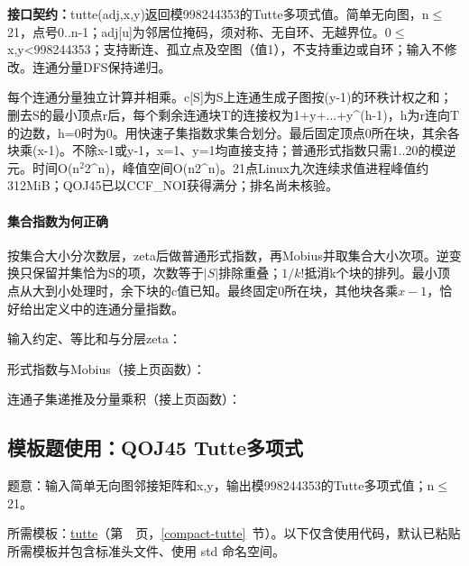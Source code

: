 {\sloppy{}\noindent\textbf{接口契约：}tutte(adj,x,y)返回模998244353的Tutte多项式值。简单无向图，n$\le$21，点号0..n-1；adj[u]为邻居位掩码，须对称、无自环、无越界位。0$\le$x,y<998244353；支持断连、孤立点及空图（值1），不支持重边或自环；输入不修改。连通分量DFS保持递归。

每个连通分量独立计算并相乘。c[S]为S上连通生成子图按(y-1)的环秩计权之和；删去S的最小顶点r后，每个剩余连通块T的连接权为1+y+...+y\textasciicircum{}(h-1)，h为r连向T的边数，h=0时为0。用快速子集指数求集合划分。最后固定顶点0所在块，其余各块乘(x-1)。不除x-1或y-1，x=1、y=1均直接支持；普通形式指数只需1..20的模逆元。时间O(n$^{2}$2\textasciicircum{}n)，峰值空间O(n2\textasciicircum{}n)。21点Linux九次连续求值进程峰值约312MiB；QOJ45已以CCF\_NOI获得满分；排名尚未核验。\par}

\paragraph{集合指数为何正确} 按集合大小分次数层，zeta后做普通形式指数，再Mobius并取集合大小次项。逆变换只保留并集恰为S的项，次数等于$|S|$排除重叠；$1/k!$抵消k个块的排列。最小顶点从大到小处理时，余下块的c值已知。最终固定0所在块，其他块各乘$x-1$，恰好给出定义中的连通分量指数。

\newpage\noindent 输入约定、等比和与分层zeta：



\newpage\noindent 形式指数与Mobius（接上页函数）：



\newpage\noindent 连通子集递推及分量乘积（接上页函数）：



\Needspace{353pt}

\subsection*{模板题使用：QOJ45 Tutte多项式}

\label{usage-example-390}

题意：输入简单无向图邻接矩阵和x,y，输出模998244353的Tutte多项式值；n$\le$21。

所需模板：\hyperref[compact-tutte]{tutte}（第~\pageref{compact-tutte}~页，\ref{compact-tutte}~节）。以下仅含使用代码，默认已粘贴所需模板并包含标准头文件、使用 std 命名空间。

